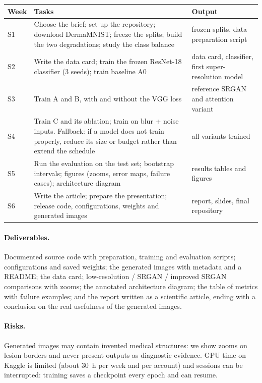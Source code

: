 \documentclass[11pt,a4paper]{article}
\begin{document}
\begin{table}[H]
\centering\small
\begin{tabularx}{\textwidth}{@{}p{1.3cm}L p{4.2cm}@{}}
\toprule
Week & Tasks & Output \\
\midrule
S1 & Choose the brief; set up the repository; download DermaMNIST; freeze the splits; build the two
degradations; study the class balance & frozen splits, data preparation script \\
S2 & Write the data card; train the frozen ResNet-18 classifier (3 seeds); train baseline A0 &
data card, classifier, first super-resolution model \\
S3 & Train A and B, with and without the VGG loss & reference SRGAN and attention variant \\
S4 & Train C and its ablation; train on blur + noise inputs. Fallback: if a model does not train
properly, reduce its size or budget rather than extend the schedule & all variants trained \\
S5 & Run the evaluation on the test set; bootstrap intervals; figures (zooms, error maps, failure
cases); architecture diagram & results tables and figures \\
S6 & Write the article; prepare the presentation; release code, configurations, weights and
generated images & report, slides, final repository \\
\bottomrule
\end{tabularx}
\end{table}

\paragraph{Deliverables.} Documented source code with preparation, training and evaluation scripts;
configurations and saved weights; the generated images with metadata and a README; the data card;
low-resolution / SRGAN / improved SRGAN comparisons with zooms; the annotated architecture diagram;
the table of metrics with failure examples; and the report written as a scientific article, ending
with a conclusion on the real usefulness of the generated images.

\paragraph{Risks.} Generated images may contain invented medical structures: we show zooms on lesion
borders and never present outputs as diagnostic evidence. GPU time on Kaggle is limited (about 30~h
per week and per account) and sessions can be interrupted: training saves a checkpoint every epoch
and can resume.
\end{document}

